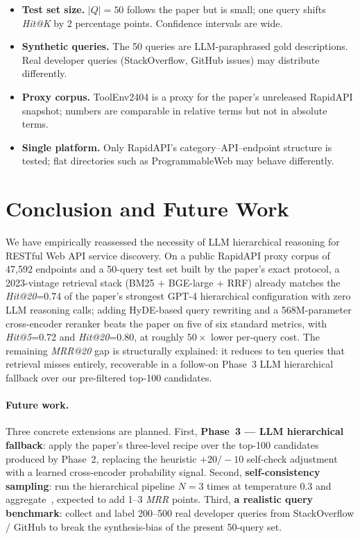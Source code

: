 \documentclass[10pt,a4paper,twocolumn]{article}
\begin{document}
\begin{itemize}[leftmargin=*]
    \item \textbf{Test set size.} \(|Q|=50\) follows the paper but is
          small; one query shifts \emph{Hit@K} by 2 percentage points.
          Confidence intervals are wide.
    \item \textbf{Synthetic queries.} The 50 queries are
          LLM-paraphrased gold descriptions. Real developer queries
          (StackOverflow, GitHub issues) may distribute differently.
    \item \textbf{Proxy corpus.} ToolEnv2404 is a proxy for the
          paper's unreleased RapidAPI snapshot; numbers are
          comparable in relative terms but not in absolute terms.
    \item \textbf{Single platform.} Only RapidAPI's
          category--API--endpoint structure is tested; flat
          directories such as ProgrammableWeb may behave differently.
\end{itemize}

\section{Conclusion and Future Work}\label{sec:conclusion}

We have empirically reassessed the necessity of LLM hierarchical
reasoning for RESTful Web API service discovery. On a public
RapidAPI proxy corpus of 47{,}592 endpoints and a 50-query test set
built by the paper's exact protocol, a 2023-vintage retrieval stack
(BM25 + BGE-large + RRF) already matches the \emph{Hit@20}=0.74 of
the paper's strongest GPT-4 hierarchical configuration with zero
LLM reasoning calls; adding HyDE-based query rewriting and a
568M-parameter cross-encoder reranker beats the paper on five of
six standard metrics, with \emph{Hit@5}=0.72 and
\emph{Hit@20}=0.80, at roughly $50\times$ lower per-query cost. The
remaining \emph{MRR@20} gap is structurally explained: it reduces
to ten queries that retrieval misses entirely, recoverable in a
follow-on Phase~3 LLM hierarchical fallback over our pre-filtered
top-100 candidates.

\paragraph{Future work.} Three concrete extensions are planned.
First, \textbf{Phase~3 --- LLM hierarchical fallback}: apply the
paper's three-level recipe over the top-100 candidates produced by
Phase~2, replacing the heuristic $+20/-10$ self-check adjustment
with a learned cross-encoder probability signal. Second,
\textbf{self-consistency sampling}: run the hierarchical pipeline
$N=3$ times at temperature $0.3$ and
aggregate~\cite{wang2023selfconsistency}, expected to add 1--3
\emph{MRR} points. Third, \textbf{a realistic query benchmark}:
collect and label 200--500 real developer queries from
StackOverflow / GitHub to break the synthesis-bias of the present
50-query set.
\end{document}
